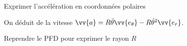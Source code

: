 \begin{enonce}
Exprimer l'accélération en coordonnées polaires
\end{enonce}


\begin{corrige} On déduit de la vitesse
$\vv{a}=R\ddot{\theta}\vv{e_\theta} - R\dot{\theta}^2 \vv{e_r}$.
\end{corrige}





\begin{enonce}
Reprendre le PFD pour exprimer le rayon $R$
\end{enonce}


